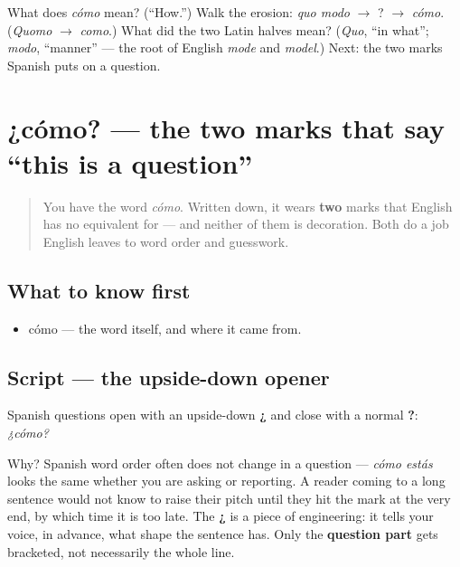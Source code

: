 \begin{tcolorbox}[breakable,colback=teal!4,colframe=teal!35!black,title={Before you move on}]
What does \emph{cómo} mean? (\textquotedblleft{}How.\textquotedblright{}) Walk the erosion: \emph{quo modo} $\to$ ? $\to$ \emph{cómo}. (\emph{Quomo} $\to$ \emph{como}.) What did the two Latin halves mean? (\emph{Quo}, \textquotedblleft{}in what\textquotedblright{}; \emph{modo}, \textquotedblleft{}manner\textquotedblright{} — the root of English \emph{mode} and \emph{model}.) Next: the two marks Spanish puts on a question.
\end{tcolorbox}
\section[¿cómo?]{¿cómo? — the two marks that say \textquotedblleft{}this is a question\textquotedblright{}}

\label{lesson:ES-C03-como-acento}



\begin{quote}
You have the word \emph{cómo}. Written down, it wears \textbf{two} marks that English has no equivalent for — and neither of them is decoration. Both do a job English leaves to word order and guesswork.
\end{quote}

\subsection*{What to know first}
\begin{itemize}
\raggedright
  \item cómo — the word itself, and where it came from.
\end{itemize}

\subsection*{Script — the upside-down opener}
Spanish questions open with an upside-down \textbf{¿} and close with a normal \textbf{?}: \emph{¿cómo?}

Why? Spanish word order often does not change in a question — \emph{cómo estás} looks the same whether you are asking or reporting. A reader coming to a long sentence would not know to raise their pitch until they hit the mark at the very end, by which time it is too late. The \textbf{¿} is a piece of engineering: it tells your voice, in advance, what shape the sentence has. Only the \textbf{question part} gets bracketed, not necessarily the whole line.

